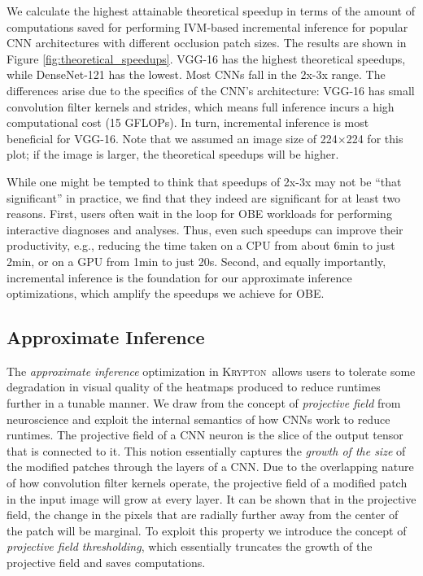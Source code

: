 \documentclass{vldb}
\newcommand{\system}{\textsc{Krypton}}
\begin{document}
We calculate the highest attainable theoretical speedup in terms of the amount of computations saved for performing IVM-based incremental inference for popular CNN architectures with different occlusion patch sizes.
The results are shown in Figure \ref{fig:theoretical_speedups}.
VGG-16 has the highest theoretical speedups, while DenseNet-121 has the lowest. Most CNNs fall in the 2x-3x range.
The differences arise due to the specifics of the CNN's architecture: VGG-16 has small convolution filter kernels and strides, which means full inference incurs a high computational cost (15 GFLOPs). In turn, incremental inference is most beneficial for VGG-16.
Note that we assumed an image size of 224$\times$224 for this plot; if the image is larger, the theoretical speedups will be higher.

While one might be tempted to think that speedups of 2x-3x may not be ``that significant'' in practice, we find that they indeed are significant for at least two reasons.
First, users often wait in the loop for OBE workloads for performing interactive diagnoses and analyses.
Thus, even such speedups can improve their productivity, e.g., reducing the time taken on a CPU from about 6min to just 2min, or on a GPU from
1min to just 20s.
Second, and equally importantly, incremental inference is the foundation for our approximate inference optimizations, which amplify the speedups we achieve for OBE.

\subsection{Approximate Inference}
The \textit{approximate inference} optimization in \system~allows users to tolerate some degradation in visual quality of the heatmaps produced to reduce runtimes further in a tunable manner.
We draw from the concept of \textit{projective field} from neuroscience and exploit the internal semantics of how CNNs work to reduce runtimes.
The projective field of a CNN neuron is the slice of the output tensor that is connected to it.
This notion essentially captures the \textit{growth of the size} of the modified patches through the layers of a CNN.
Due to the overlapping nature of how convolution filter kernels operate, the projective field of a modified patch in the input image will grow at every layer.
It can be shown that in the projective field, the change in the pixels that are radially further away from the center of the patch will be marginal.
To exploit this property we introduce the concept of \textit{projective field thresholding}, which essentially truncates the growth of the projective field and saves computations.
\end{document}
